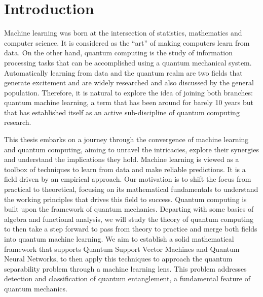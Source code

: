 %


\chapter{Introduction}

Machine learning was born at the intersection of statistics, mathematics and computer science. It is considered as the ``art'' of making computers learn from data. On the other hand, quantum computing is the study of information processing tasks that can be accomplished using a quantum mechanical system. Automatically learning from data and the quantum realm are two fields that generate excitement and are widely researched and also discussed by the general population. Therefore, it is natural to explore the idea of joining both branches: quantum machine learning, a term that has been around for barely 10 years but that has established itself as an active sub-discipline of quantum computing research. 
\vspace{5pt}

This thesis embarks on a journey through the convergence of machine learning and quantum computing, aiming to unravel the intricacies, explore their synergies and understand the implications they hold. Machine learning is viewed as a toolbox of techniques to learn from data and make reliable predictions. It is a field driven by an empirical approach. Our motivation is to shift the focus from practical to theoretical, focusing on its mathematical fundamentals to understand the working principles that drives this field to success. Quantum computing is built upon the framework of quantum mechanics. Departing with some basics of algebra and functional analysis, we will study the theory of quantum computing to then take a step forward to pass from theory to practice and merge both fields into quantum machine learning. We aim to establish a solid mathematical framework that supports Quantum Support Vector Machines and Quantum Neural Networks, to then apply this techniques to approach the quantum separability problem through a machine learning lens. This problem addresses detection and classification of quantum entanglement, a fundamental feature of quantum mechanics.
\vspace{5pt}

